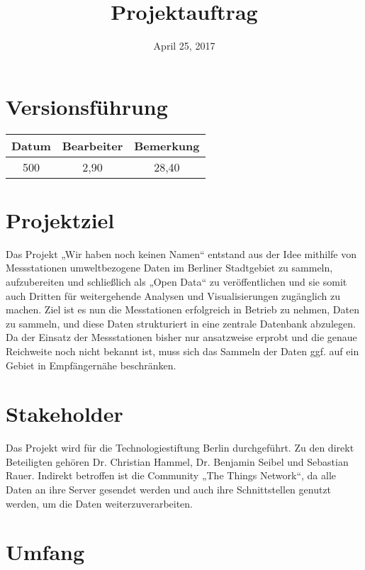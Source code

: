 \documentclass[
11pt,
a4paper,
ngerman,
tablecaptionabove
]{article}
\title{Projektauftrag}
\author{Mark Otto \and }
\date{April 25, 2017}
\begin{document}
\begin{titlepage}
\centering
\maketitle
\end{titlepage}

\tableofcontents
\listoffigures
\listoftables

\section{Versionsführung}
\begin{table}[H]
\centering
\begin{tabular}{|c|c|c|}
	\hline
	\textbf{ Datum } &
	\textbf{ Bearbeiter } &
	\textbf{ Bemerkung } \\
	\hline 
		500	& 2,90 & 28,40 \\
	\hline
\end{tabular}
\end{table}

\section{Projektziel}
Das Projekt „Wir haben noch keinen Namen“ entstand aus der Idee mithilfe von Messstationen umweltbezogene Daten im Berliner Stadtgebiet zu sammeln, aufzubereiten und schließlich als „Open Data“ zu veröffentlichen und sie somit auch Dritten für weitergehende Analysen und Visualisierungen zugänglich zu machen.
Ziel ist es nun die Messtationen erfolgreich in Betrieb zu nehmen, Daten zu sammeln, und diese Daten strukturiert in eine zentrale Datenbank abzulegen.
Da der Einsatz der Messstationen bisher nur ansatzweise erprobt und die genaue Reichweite noch nicht bekannt ist, muss sich das Sammeln der Daten ggf. auf ein Gebiet in Empfängernähe beschränken.

\section{Stakeholder}
Das Projekt wird für die Technologiestiftung Berlin durchgeführt. Zu den direkt Beteiligten gehören Dr. Christian Hammel, Dr. Benjamin Seibel und Sebastian Rauer.
Indirekt betroffen ist die Community „The Things Network“, da alle Daten an ihre Server gesendet werden und auch ihre Schnittstellen genutzt werden, um die Daten weiterzuverarbeiten.

\section{Umfang}
\end{document}
